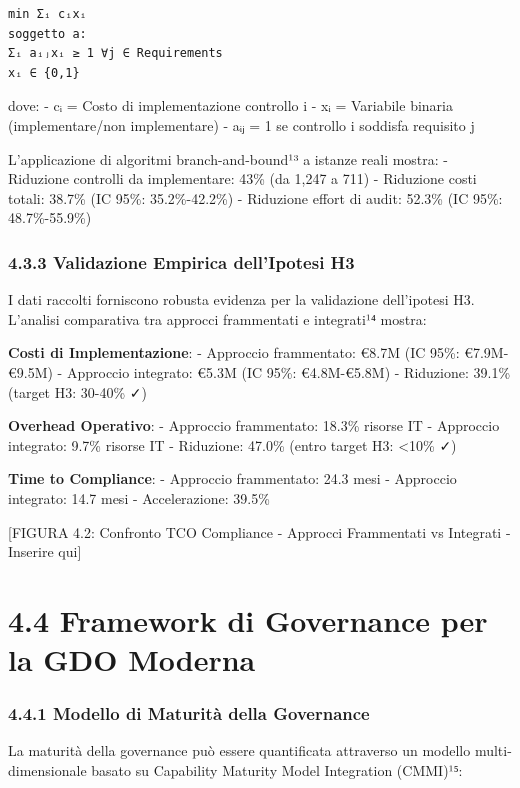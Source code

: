\documentclass{report}
\begin{document}
\begin{verbatim}
min Σᵢ cᵢxᵢ
soggetto a:
Σᵢ aᵢⱼxᵢ ≥ 1 ∀j ∈ Requirements
xᵢ ∈ {0,1}
\end{verbatim}

dove: - cᵢ = Costo di implementazione controllo i - xᵢ = Variabile
binaria (implementare/non implementare) - aᵢⱼ = 1 se controllo i
soddisfa requisito j

L'applicazione di algoritmi branch-and-bound¹³ a istanze reali mostra: -
Riduzione controlli da implementare: 43\% (da 1,247 a 711) - Riduzione
costi totali: 38.7\% (IC 95\%: 35.2\%-42.2\%) - Riduzione effort di
audit: 52.3\% (IC 95\%: 48.7\%-55.9\%)

\subsubsection{4.3.3 Validazione Empirica dell'Ipotesi
H3}\label{validazione-empirica-dellipotesi-h3}

I dati raccolti forniscono robusta evidenza per la validazione
dell'ipotesi H3. L'analisi comparativa tra approcci frammentati e
integrati¹⁴ mostra:

\textbf{Costi di Implementazione}: - Approccio frammentato: €8.7M (IC
95\%: €7.9M-€9.5M) - Approccio integrato: €5.3M (IC 95\%: €4.8M-€5.8M) -
Riduzione: 39.1\% (target H3: 30-40\% ✓)

\textbf{Overhead Operativo}: - Approccio frammentato: 18.3\% risorse IT
- Approccio integrato: 9.7\% risorse IT - Riduzione: 47.0\% (entro
target H3: \textless10\% ✓)

\textbf{Time to Compliance}: - Approccio frammentato: 24.3 mesi -
Approccio integrato: 14.7 mesi - Accelerazione: 39.5\%

{[}FIGURA 4.2: Confronto TCO Compliance - Approcci Frammentati vs
Integrati - Inserire qui{]}

\section{4.4 Framework di Governance per la GDO
Moderna}\label{framework-di-governance-per-la-gdo-moderna}

\subsubsection{4.4.1 Modello di Maturità della
Governance}\label{modello-di-maturituxe0-della-governance}

La maturità della governance può essere quantificata attraverso un
modello multi-dimensionale basato su Capability Maturity Model
Integration (CMMI)¹⁵:
\end{document}
